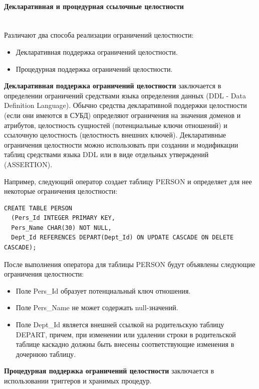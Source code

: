 \paragraph{Декларативная и процедурная ссылочные целостности} ~\\
Различают два способа реализации ограничений целостности:
\begin{itemize}
\item Декларативная поддержка ограничений целостности.
\item Процедурная поддержка ограничений целостности.
\end{itemize}
\begin{grayquote}
\textbf{Декларативная поддержка ограничений целостности} заключается в определении ограничений средствами языка определения данных (DDL - Data Definition Language). Обычно средства декларативной поддержки целостности (если они имеются в СУБД) определяют ограничения на значения доменов и атрибутов, целостность сущностей (потенциальные ключи отношений) и ссылочную целостность (целостность внешних ключей). Декларативные ограничения целостности можно использовать при создании и модификации таблиц средствами языка DDL или в виде отдельных утверждений (ASSERTION).
\end{grayquote}

Например, следующий оператор создает таблицу PERSON и определяет для нее некоторые ограничения целостности:

\begin{verbatim}
CREATE TABLE PERSON
  (Pers_Id INTEGER PRIMARY KEY,
  Pers_Name CHAR(30) NOT NULL,
  Dept_Id REFERENCES DEPART(Dept_Id) ON UPDATE CASCADE ON DELETE CASCADE);
\end{verbatim}

После выполнения оператора для таблицы PERSON будут объявлены следующие ограничения целостности:
\begin{itemize}
\item Поле Pers\_Id образует потенциальный ключ отношения.
\item Поле Pers\_Name не может содержать null-значений.
\item Поле Dept\_Id является внешней ссылкой на родительскую таблицу DEPART, причем, при изменении или удалении строки в родительской таблице каскадно должны быть внесены соответствующие изменения в дочернюю таблицу.
\end{itemize}
\begin{grayquote}
\textbf{Процедурная поддержка ограничений целостности} заключается в использовании триггеров и хранимых процедур.
\end{grayquote}

